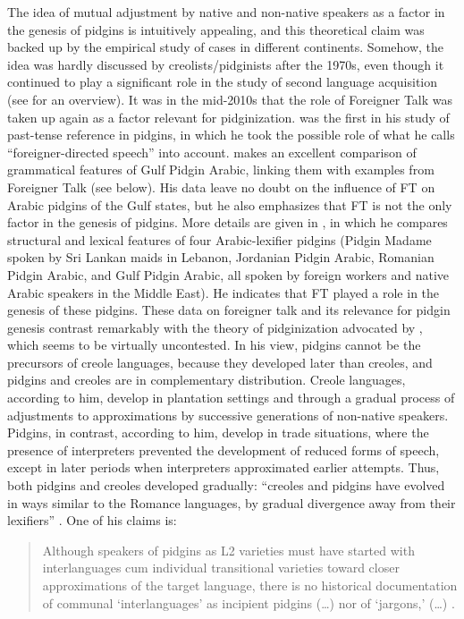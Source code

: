 \documentclass[output=paper,colorlinks,citecolor=brown]{langscibook}
\begin{document}
The idea of mutual adjustment by native and non-native speakers as a factor in the genesis of pidgins is intuitively appealing, and this theoretical claim was backed up by the empirical study of cases in different continents. Somehow, the idea was hardly discussed by creolists/pidginists after the 1970s, even though it continued to play a significant role in the study of second language acquisition (see \cite{DelaRosa2016} for an overview).
It was in the mid-2010s that the role of Foreigner Talk was taken up again as a factor relevant for pidginization. \citet{Versteegh2014} was the first in his study of past-tense reference in pidgins, in which he took the possible role of what he calls “foreigner-directed speech” into account. \citet{Avram2017} makes an excellent comparison of grammatical features of Gulf Pidgin Arabic, linking them with examples from Foreigner Talk (see below). His data leave no doubt on the influence of FT on Arabic pidgins of the Gulf states, but he also emphasizes that FT is not the only factor in the genesis of pidgins. More details are given in \citet{Avram2018}, in which he compares structural and lexical features of four Arabic-lexifier pidgins (Pidgin Madame spoken by Sri Lankan maids in Lebanon, Jordanian Pidgin Arabic, Romanian Pidgin Arabic, and Gulf Pidgin Arabic, all spoken by foreign workers and native Arabic speakers in the Middle East). He indicates that FT played a role in the genesis of these pidgins.
These data on foreigner talk and its relevance for pidgin genesis contrast remarkably with the theory of pidginization advocated by \citet{Mufwene2015,Mufwene2020}, which seems to be virtually uncontested. In his view, pidgins cannot be the precursors of creole languages, because they developed later than creoles, and pidgins and creoles are in complementary distribution. Creole languages, according to him, develop in plantation settings and through a gradual process of adjustments to approximations by successive generations of non-native speakers. Pidgins, in contrast, according to him, develop in trade situations, where the presence of interpreters prevented the development of reduced forms of speech, except in later periods when interpreters approximated earlier attempts. Thus, both pidgins and creoles developed gradually: “creoles and pidgins have evolved in ways similar to the Romance languages, by gradual divergence away from their lexifiers” \citep[302]{Mufwene2020}. One of his claims is:

\begin{quote}
Although speakers of pidgins as L2 varieties must have started with interlanguages cum individual transitional varieties toward closer approximations of the target language, there is no historical documentation of communal ‘interlanguages’ as incipient pidgins (…) nor of ‘jargons,’
 (…) \citep[301]{Mufwene2020}.
\end{quote}
\end{document}
